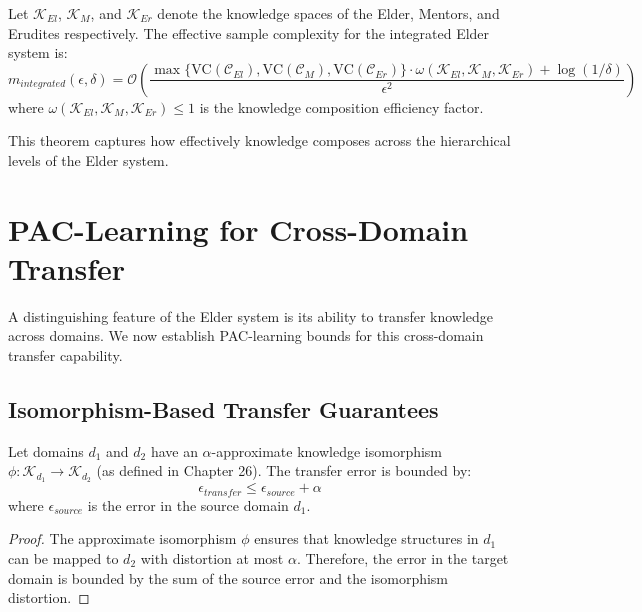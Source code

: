 \begin{theorem}
Let $\mathcal{K}_{El}$, $\mathcal{K}_{M}$, and $\mathcal{K}_{Er}$ denote the knowledge spaces of the Elder, Mentors, and Erudites respectively. The effective sample complexity for the integrated Elder system is:
\begin{equation}
m_{integrated}(\epsilon, \delta) = \mathcal{O}\left(\frac{\max\{\text{VC}(\mathcal{C}_{El}), \text{VC}(\mathcal{C}_{M}), \text{VC}(\mathcal{C}_{Er})\} \cdot \omega(\mathcal{K}_{El}, \mathcal{K}_{M}, \mathcal{K}_{Er}) + \log(1/\delta)}{\epsilon^2}\right)
\end{equation}
where $\omega(\mathcal{K}_{El}, \mathcal{K}_{M}, \mathcal{K}_{Er}) \leq 1$ is the knowledge composition efficiency factor.
\end{theorem}

This theorem captures how effectively knowledge composes across the hierarchical levels of the Elder system.

\section{PAC-Learning for Cross-Domain Transfer}

A distinguishing feature of the Elder system is its ability to transfer knowledge across domains. We now establish PAC-learning bounds for this cross-domain transfer capability.



\subsection{Isomorphism-Based Transfer Guarantees}

\begin{theorem}
Let domains $d_1$ and $d_2$ have an $\alpha$-approximate knowledge isomorphism $\phi: \mathcal{K}_{d_1} \rightarrow \mathcal{K}_{d_2}$ (as defined in Chapter 26). The transfer error is bounded by:
\begin{equation}
\epsilon_{transfer} \leq \epsilon_{source} + \alpha
\end{equation}
where $\epsilon_{source}$ is the error in the source domain $d_1$.
\end{theorem}

\begin{proof}
The approximate isomorphism $\phi$ ensures that knowledge structures in $d_1$ can be mapped to $d_2$ with distortion at most $\alpha$. Therefore, the error in the target domain is bounded by the sum of the source error and the isomorphism distortion.
\end{proof}

